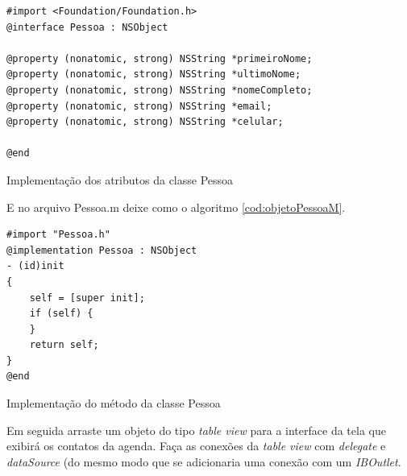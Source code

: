 \documentclass[a4paper,12pt,brazil,oneside]{book}
\begin{document}
\begin{listing}[H]
\begin{verbatim}
#import <Foundation/Foundation.h>
@interface Pessoa : NSObject

@property (nonatomic, strong) NSString *primeiroNome;
@property (nonatomic, strong) NSString *ultimoNome;
@property (nonatomic, strong) NSString *nomeCompleto;
@property (nonatomic, strong) NSString *email;
@property (nonatomic, strong) NSString *celular;

@end
\end{verbatim}
\caption{Implementação dos atributos da classe Pessoa}
\label{cod:objetoPessoaH}
\end{listing}

E no arquivo Pessoa.m deixe como o algoritmo \ref{cod:objetoPessoaM}.

\begin{listing}[H]
\begin{verbatim}
#import "Pessoa.h"
@implementation Pessoa : NSObject
- (id)init
{
    self = [super init];
    if (self) {        
    }
    return self;
}
@end
\end{verbatim}
\caption{Implementação do método da classe Pessoa}
\label{cod:objetoPessoaM}
\end{listing}

Em seguida arraste um objeto do tipo \emph{table view} para a interface da tela que exibirá os contatos da agenda. Faça as conexões da \emph{table view} com \emph{delegate} e \emph{dataSource} (do mesmo modo que se adicionaria uma conexão com um \emph{IBOutlet}.
\end{document}
